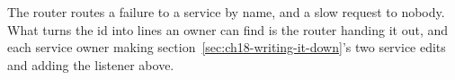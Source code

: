 %
The router routes a failure to a service by name, and a slow request to
nobody. What turns the id into lines an owner can find is the router handing
it out, and each service owner making section~\ref{sec:ch18-writing-it-down}'s
two service edits and adding the listener above.
%
